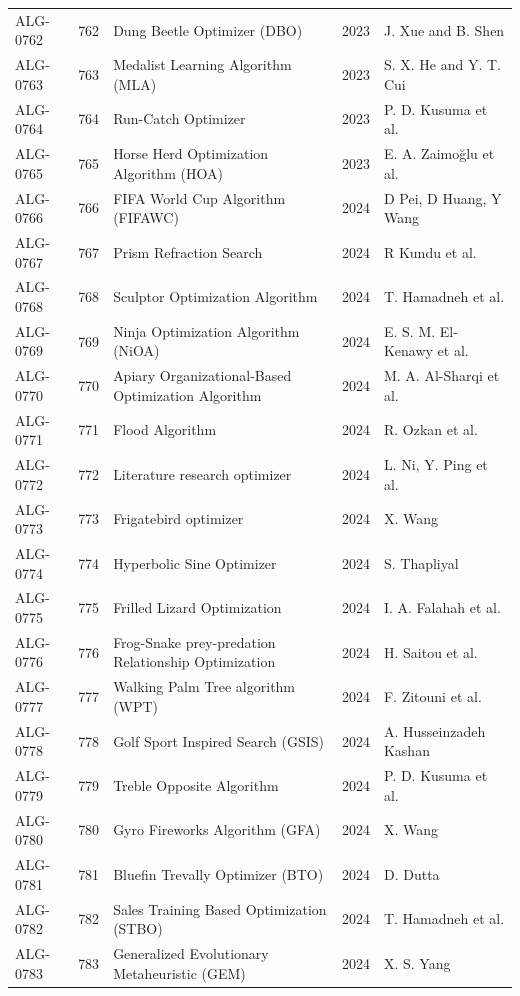 \documentclass[8pt]{article}
\begin{document}
\begin{landscape}
\begin{longtable}{P{1.7cm}rP{10.0cm}rP{7.2cm}}
ALG-0762 & 762 & Dung Beetle Optimizer (DBO) & 2023 & J. Xue and B. Shen \\
ALG-0763 & 763 & Medalist Learning Algorithm (MLA) & 2023 & S. X. He and Y. T. Cui \\
ALG-0764 & 764 & Run-Catch Optimizer & 2023 & P. D. Kusuma et al. \\
ALG-0765 & 765 & Horse Herd Optimization Algorithm (HOA) & 2023 & E. A. Zaimoğlu et al. \\
ALG-0766 & 766 & FIFA World Cup Algorithm (FIFAWC) & 2024 & D Pei, D Huang, Y Wang \\
ALG-0767 & 767 & Prism Refraction Search & 2024 & R Kundu et al. \\
ALG-0768 & 768 & Sculptor Optimization Algorithm & 2024 & T. Hamadneh et al. \\
ALG-0769 & 769 & Ninja Optimization Algorithm (NiOA) & 2024 & E. S. M. El-Kenawy et al. \\
ALG-0770 & 770 & Apiary Organizational-Based Optimization Algorithm & 2024 & M. A. Al-Sharqi et al. \\
ALG-0771 & 771 & Flood Algorithm & 2024 & R. Ozkan et al. \\
ALG-0772 & 772 & Literature research optimizer & 2024 & L. Ni, Y. Ping et al. \\
ALG-0773 & 773 & Frigatebird optimizer & 2024 & X. Wang \\
ALG-0774 & 774 & Hyperbolic Sine Optimizer & 2024 & S. Thapliyal \\
ALG-0775 & 775 & Frilled Lizard Optimization & 2024 & I. A. Falahah et al. \\
ALG-0776 & 776 & Frog-Snake prey-predation Relationship Optimization & 2024 & H. Saitou et al. \\
ALG-0777 & 777 & Walking Palm Tree algorithm (WPT) & 2024 & F. Zitouni et al. \\
ALG-0778 & 778 & Golf Sport Inspired Search (GSIS) & 2024 & A. Husseinzadeh Kashan \\
ALG-0779 & 779 & Treble Opposite Algorithm & 2024 & P. D. Kusuma et al. \\
ALG-0780 & 780 & Gyro Fireworks Algorithm (GFA) & 2024 & X. Wang \\
ALG-0781 & 781 & Bluefin Trevally Optimizer (BTO) & 2024 & D. Dutta \\
ALG-0782 & 782 & Sales Training Based Optimization (STBO) & 2024 & T. Hamadneh et al. \\
ALG-0783 & 783 & Generalized Evolutionary Metaheuristic  (GEM) & 2024 & X. S. Yang \\

\end{longtable}
\end{landscape}
\end{document}
